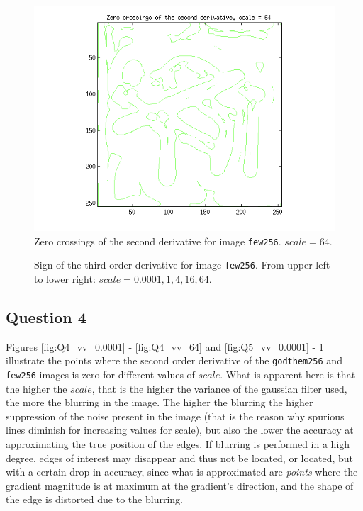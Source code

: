 \begin{figure}[H]
	\centering
	\includegraphics[scale=0.8]{./images/Q5/vv/64.png}
	\caption{Zero crossings of the second derivative for image \texttt{few256}. $scale = 64$.}
	\label{fig:Q5_vv_64}
\end{figure}


\begin{figure}[H]
	\centering
	\scalebox{0.8}{}
	\caption{Sign of the third order derivative for image \texttt{few256}. From upper left to lower right: $scale = 0.0001, 1, 4, 16, 64$.}
	\label{fig:Q5_vvv_}
\end{figure}



\subsection{Question 4}

Figures \ref{fig:Q4_vv_0.0001} - \ref{fig:Q4_vv_64} and
\ref{fig:Q5_vv_0.0001} - \ref{fig:Q5_vv_64} illustrate the points where
the second order derivative of the \texttt{godthem256} and \texttt{few256} images
is zero for different values of $scale$. What is apparent here is that the higher the $scale$,
that is the higher the variance of the gaussian filter used, the more the blurring
in the image. The higher the blurring the higher suppression of the noise
present in the image (that is the reason why spurious lines diminish for
increasing values for scale), but also the lower the accuracy at approximating
the true position of the edges. If blurring is performed in a high degree,
edges of interest may disappear and thus not be located,
or located, but with a certain drop in accuracy, since what is approximated are
\textit{points} where the gradient magnitude is at maximum at the gradient's direction,
and the shape of the edge is distorted due to the blurring.


